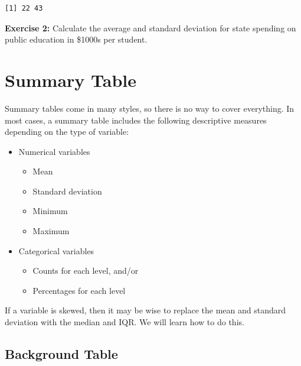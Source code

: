 \documentclass[
]{book}
\makeatletter
\newenvironment{Shaded}{\begin{snugshade}}{\end{snugshade}}
\newcommand{\FunctionTok}[1]{\textcolor[rgb]{0,0,0}{#1}}
\newcommand{\NormalTok}[1]{#1}
\newcommand{\SpecialCharTok}[1]{\textcolor[rgb]{0,0,0}{#1}}
\providecommand{\tightlist}{%
  \setlength{\itemsep}{0pt}\setlength{\parskip}{0pt}}
\newenvironment{kframe}{%
\medskip{}
\setlength{\fboxsep}{.8em}
 \def\at@end@of@kframe{}%
 \ifinner\ifhmode%
  \def\at@end@of@kframe{\end{minipage}}%
  \begin{minipage}{\columnwidth}%
 \fi\fi%
 \def\FrameCommand##1{\hskip\@totalleftmargin \hskip-\fboxsep
 \colorbox{shadecolor}{##1}\hskip-\fboxsep
     \hskip-\linewidth \hskip-\@totalleftmargin \hskip\columnwidth}%
 \MakeFramed {\advance\hsize-\width
   \@totalleftmargin\z@ \linewidth\hsize
   \@setminipage}}%
 {\par\unskip\endMakeFramed%
 \at@end@of@kframe}
\renewenvironment{Shaded}{\begin{kframe}}{\end{kframe}}
\newenvironment{rmdblock}[1]
  {\begin{shaded*}
  }
  {\end{shaded*}
  }
\newenvironment{learncheck}
  {\begin{rmdblock}{warning}}
  {\end{rmdblock}}
\makeatother
\begin{document}
\begin{Shaded}
\end{Shaded}

\begin{verbatim}
[1] 22 43
\end{verbatim}

\begin{learncheck}
\textbf{Exercise 2:} Calculate the average and standard deviation for
state spending on public education in \$1000s per student.
\end{learncheck}

\hypertarget{summary-table}{%
\section{Summary Table}\label{summary-table}}

Summary tables come in many styles, so there is no way to cover everything. In most cases, a summary table includes the following descriptive measures depending on the type of variable:

\begin{itemize}
\tightlist
\item
  Numerical variables

  \begin{itemize}
  \tightlist
  \item
    Mean
  \item
    Standard deviation
  \item
    Minimum
  \item
    Maximum
  \end{itemize}
\item
  Categorical variables

  \begin{itemize}
  \tightlist
  \item
    Counts for each level, and/or
  \item
    Percentages for each level
  \end{itemize}
\end{itemize}

If a variable is skewed, then it may be wise to replace the mean and standard deviation with the median and IQR. We will learn how to do this.

\hypertarget{background-table}{%
\subsection{Background Table}\label{background-table}}
\end{document}

